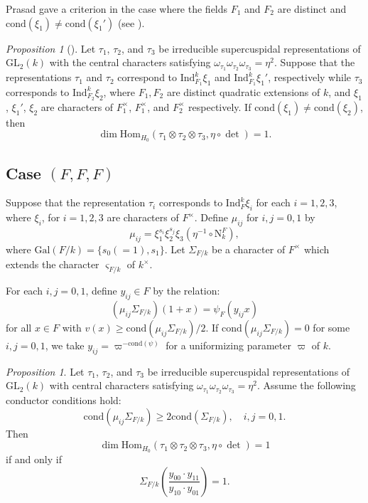 \documentclass[12pt]{amsart}
\newcommand{\Gal}{{\mathrm{Gal}}}
\newcommand{\GL}{{\mathrm{GL}}}
\newcommand{\Hom}{{\mathrm{Hom}}}
\newcommand{\N}{{\mathrm{N}}}
\theoremstyle{Theorem}
\theoremstyle{Theorem}
\theoremstyle{Theorem}
\theoremstyle{Theorem}
\theoremstyle{Plain}
\theoremstyle{remark}
\theoremstyle{remark}
\theoremstyle{Definition}
\newtheorem{prpd}[dfn]{Proposition}
\begin{document}
Prasad gave a criterion in the case where the fields $F_1$ and $F_2$ are distinct and $ \mathrm{cond} ( \xi_1 ) \ne \mathrm{cond} ( \xi_1' ) $ (see \cite[Proposition 8.10]{Prasad}).

\begin{prpd}[{\cite[Proposition 8.10]{Prasad}}]
    \label{cr3}
    Let $\tau_1$, $\tau_2$, and $\tau_3$ be irreducible supercuspidal representations of $\GL_2(k)$ with the central characters satisfying $ \omega_{ \tau_1 } \omega_{ \tau_2 } \omega_{ \tau_3 } = \eta^{2} $. Suppose that the representations $\tau_1$ and $\tau_2$ correspond to $ \mathrm{Ind}^k_{ F_1 } \xi_1 $ and $ \mathrm{Ind}^k_{ F_1 } \xi_1' $, respectively while $\tau_3$ corresponds to $ \mathrm{Ind}^k_{ F_2 } \xi_2 $, where $F_1, F_2$ are distinct quadratic extensions of $k$, and $\xi_1$, $\xi_1'$, $\xi_2$ are characters of $F_1^\times$, $F_1^\times$, and $F_2^\times$ respectively. If $\mathrm{cond} ( \xi_1 ) \ne \mathrm{cond} ( \xi_2 ) $, then
    \[
        \dim \Hom_{ H_0 } \left( \tau_1 \otimes \tau_2 \otimes \tau_3, \eta \circ \det \right) = 1.
    \]
\end{prpd}

\subsection{Case $(F,F,F)$}

Suppose that the representation $\tau_i$ corresponds to $ \mathrm{Ind}^k_F \xi_i $ for each $ i = 1, 2, 3 $, where $\xi_i$, for $ i = 1, 2, 3 $ are characters of $F^\times$. Define $\mu_{ij}$ for $ i, j = 0, 1 $ by
\[
    \mu_{ij} = \xi_1^{ s_i } \xi_2^{ s_j } \xi_3 \left( \eta^{-1} \circ { \N^F_k } \right),
\]
where $ \Gal( F/k ) = \{ s_0 ( = 1 ), s_1 \} $. Let $\Sigma_{F/k}$ be a character of $F^\times$ which extends the character $\varsigma_{F/k}$ of $k^\times$.
        
For each $ i, j = 0, 1 $, define $ y_{ij} \in F $ by the relation:
\[
    \left( \mu_{ij} \Sigma_{ F/k } \right) (1 + x) = \psi_F ( y_{ij} x )
\]
for all $ x \in F $ with $ v(x) \ge \mathrm{cond} \left( \mu_{ij} \Sigma_{ F/k } \right) / 2 $. If $ \mathrm{cond} \left( \mu_{ij} \Sigma_{ F/k } \right) = 0 $ for some $ i, j = 0, 1 $, we take $ y_{ij} = \varpi^{ -\mathrm{cond}( \psi ) } $ for a uniformizing parameter $\varpi$ of $k$.

\begin{prpd}
    \label{cr4}
    Let $\tau_1$, $\tau_2$, and $\tau_3$ be irreducible supercuspidal representations of $\GL_2(k)$ with central characters satisfying $ \omega_{ \tau_1 } \omega_{ \tau_2 } \omega_{ \tau_3 } = \eta^2$. Assume the following conductor conditions hold:
    \[
        \mathrm{cond} \left( \mu_{ij} \Sigma_{ F/k } \right) \ge 2 \mathrm{cond} \left( \Sigma_{ F/k } \right), \quad i, j = 0, 1.
    \]
    Then
    \[
        \dim \Hom_{ H_0 } \left( \tau_1 \otimes \tau_2 \otimes \tau_3, \eta \circ \det \right) = 1
    \]
    if and only if
    \[
        \Sigma_{ F/k } \left( \frac{ y_{00} \cdot y_{11} }{ y_{10} \cdot y_{01} } \right) = 1.
    \]
\end{prpd}
\end{document}
